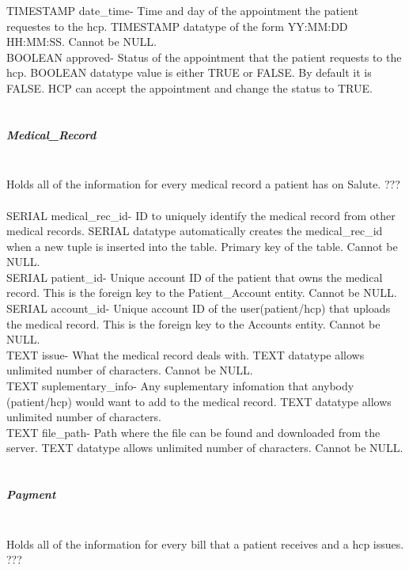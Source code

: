 \documentclass[12pt]{report}
\begin{document}
TIMESTAMP date_time- Time and day of the appointment the patient requestes to the hcp.  TIMESTAMP datatype of the form YY:MM:DD HH:MM:SS.  Cannot be NULL.\\

BOOLEAN approved- Status of the appointment that the patient requests to the hcp.  BOOLEAN datatype value is either TRUE or FALSE.  By default it is FALSE.  HCP can accept the appointment and change the status to TRUE.\\ \\

\subparagraph{Medical_Record}\\
Holds all of the information for every medical record a patient has on Salute.  ???\\ \\

SERIAL medical_rec_id- ID to uniquely identify the medical record from other medical records. SERIAL datatype automatically creates the medical_rec_id when a new tuple is inserted into the table.  Primary key of the table.  Cannot be NULL.\\

SERIAL patient_id- Unique account ID of the patient that owns the medical record.  This is the foreign key to the Patient_Account entity.  Cannot be NULL.\\

SERIAL account_id- Unique account ID of the user(patient/hcp) that uploads the medical record.  This is the foreign key to the Accounts entity.  Cannot be NULL.\\

TEXT issue-  What the medical record deals with.  TEXT datatype allows unlimited number of characters.  Cannot be NULL.\\

TEXT suplementary_info- Any suplementary infomation that anybody (patient/hcp) would want to add to the medical record.  TEXT datatype allows unlimited number of characters.\\

TEXT file_path- Path where the file can be found and downloaded from the server.  TEXT datatype allows unlimited number of characters.  Cannot be NULL.\\ \\

\subparagraph{Payment}\\
Holds all of the information for every bill that a patient receives and a hcp issues.  ???\\ \\
\end{document}
